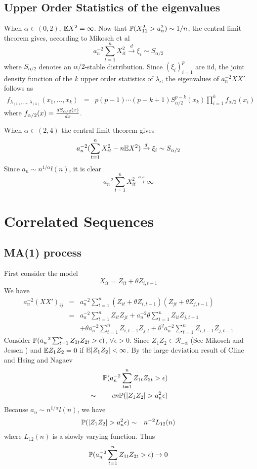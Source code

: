 \documentclass{article}
\begin{document}
\subsection{Upper Order Statistics of the eigenvalues}
When $\alpha \in (0,2)$, $\E X^2 = \infty$. Now that
$\P(X_{11}^2 > a_n^2) \sim 1/n$, the central limit theorem 
gives, according to Mikosch et al\cite{Embrechts1997} 
\[
a_n^{-2} \sum_{t=1}^n X_{it}^2 \xrightarrow{d} \xi_i \sim S_{\alpha/2}
\]
where $S_{\alpha/2}$ denotes an $\alpha/2$-stable distribution.
Since $(\xi_i)_{i=1}^p$ are iid, the joint density function of the $k$
upper order statistics of $\lambda_i$, the eigenvalues of $a_n^{-2} X X'$
follows as
\begin{eqnarray*}
  f_{\lambda_{(1)}, \dots, \lambda_{(k)}}(x_1, \dots, x_k) &=&
  p(p-1)\cdots(p-k+1) S_{\alpha/2}^{p-k}(x_k) \prod_{i=1}^k
  f_{\alpha/2}(x_i)
\end{eqnarray*}
where $f_{\alpha/2}(x) = {d S_{\alpha/2}(x) \over dx}$.

When $\alpha \in (2,4)$ the central limit theorem gives
\[
a_n^{-2} (\sum_{t=1}^n X_{it}^2 - n \E X^2)\xrightarrow{d}
\xi_i \sim S_{\alpha/2}
\]
Since $a_n \sim n^{1/\alpha} l(n)$, it is clear
\[
a_n^{-2} \sum_{t=1}^n X_{it}^2 \xrightarrow{a.s}\infty
\]

\section{Correlated Sequences}
\subsection{MA(1) process}
First consider the model
\[
X_{it} = Z_{it} + \theta Z_{i,t-1}
\]
We have
\begin{eqnarray*}
  a_n^{-2}(XX')_{ij} &=& a_n^{-2} \sum_{t=1}^n (Z_{it} + \theta
  Z_{i,t-1}) (Z_{jt} + \theta Z_{j,t-1}) \\
  &=& a_n^{-2} \sum_{t=1}^n Z_{it} Z_{jt} + a_n^{-2} \theta \sum_{t=1}^n
  Z_{it} Z_{j,t-1} \\
  && +\theta a_n^{-2} \sum_{t=1}^n Z_{i, t-1}
  Z_{j,t} + \theta^2 a_n^{-2} \sum_{t=1}^n Z_{i,t-1} Z_{j,t-1}
\end{eqnarray*}
Consider $\P(a_n^{-2} \sum_{t=1}^n Z_{1t} Z_{2t} > \epsilon)$,
$\forall \epsilon>0$. Since $Z_1 Z_2 \in \mathcal R_{-\alpha}$ (See
Mikosch and Jessen \cite{jessen:mikosch:2006}) and $\E Z_1 Z_2 = 0$ if
$\E|Z_1Z_2| < \infty$. By the large deviation result of Cline and
Hsing \cite{cline:hsing:1998} and Nagaev \cite{nagaev:1979}
\begin{eqnarray*}
  && \P(a_n^{-2} \sum_{t=1}^n Z_{1t} Z_{2t} > \epsilon)  \\
  &\sim& c n \P(|Z_1 Z_2| > a_n^{2} \epsilon)  \\
\end{eqnarray*}
Because $a_n \sim n^{1/\alpha} l(n)$, we have
\begin{eqnarray*}
  \P(|Z_1 Z_2| > a_n^{2} \epsilon) &\sim& n^{-2} L_{12}(n)
\end{eqnarray*}
where $L_{12}(n)$ is a slowly varying function. Thus
\[
\P(a_n^{-2} \sum_{t=1}^n Z_{1t} Z_{2t} > \epsilon) \to 0
\]
\end{document}
